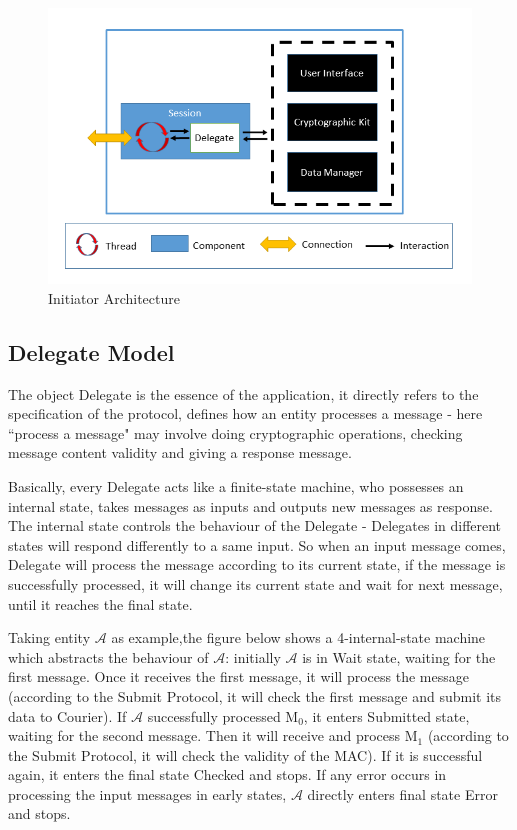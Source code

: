 \begin{figure}[h!]
\centering
\includegraphics[width=\textwidth,natwidth=700,natheight=456]{figures/initiatorarchitecture.png}
\caption{Initiator Architecture}
\end{figure}

\subsection{Delegate Model}
The object Delegate is the essence of the application, it directly refers to the specification of the protocol, defines how an entity processes a message - here ``process a message" may involve doing cryptographic operations, checking message content validity and giving a response message.

Basically, every Delegate acts like a finite-state machine, who possesses an internal state, takes messages as inputs and outputs new messages as response. The internal state controls the behaviour of the Delegate - Delegates in different states will respond differently to a same input. So when an input message comes, Delegate will process the message according to its current state, if the message is successfully processed, it will change its current state and wait for next message, until it reaches the final state. 

Taking entity $\mathcal{A}$ as example,the figure below shows a 4-internal-state machine which abstracts the behaviour of $\mathcal{A}$: initially $\mathcal{A}$ is in Wait state, waiting for the first message. Once it receives the first message, it will process the message (according to the Submit Protocol, it will check the first message and submit its data to Courier). If $\mathcal{A}$ successfully processed M$_0$, it enters Submitted state, waiting for the second message. Then it will receive and process M$_1$ (according to the Submit Protocol, it will check the validity of the MAC).  If it is successful again, it enters the final state Checked and stops. If any error occurs in processing the input messages in early states, $\mathcal{A}$ directly enters final state Error and stops.

